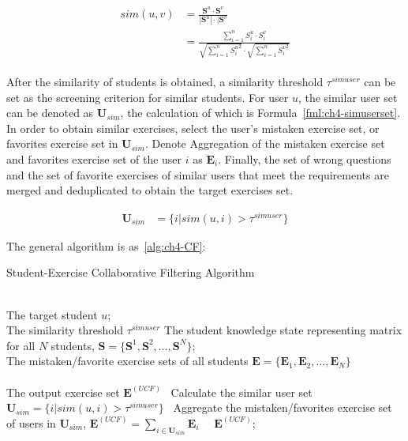 \begin{align}\label{fml:ch4-user_similarity}
  \begin{split}
    sim(u, v) & =\frac{\mathbf{S}^u \cdot \mathbf{S}^v}{|\mathbf{S}^u|\cdot |\mathbf{S}^v}                                                                 \\
    & =\frac{\sum\limits_{i = 1}^{n}{S^u_i\cdot S^v_i}}{\sqrt{\sum\limits_{i = 1}^{n}{{S^u_i}^2}}\cdot\sqrt{\sum\limits_{i = 1}^{n}{{S^v_i}^2}}}
  \end{split}
\end{align}

After the similarity of students is obtained, a similarity threshold \(\tau^{simuser}\) can be set as the screening criterion for similar students. For user \(u\), the similar user set can be denoted as \(\mathbf{U}_{sim}\), the calculation of which is Formula~\ref{fml:ch4-simuserset}. In order to obtain similar exercises, select the user's mistaken exercise set, or favorites exercise set in \(\mathbf{U}_{sim}\). Denote Aggregation of the mistaken exercise set and favorites exercise set of the user \(i\) as \(\mathbf{E}_{i}\). Finally, the set of wrong questions and the set of favorite exercises of similar users that meet the requirements are merged and deduplicated to obtain the target exercises set.

\begin{align}
  \mathbf{U}_{sim} & =\{i|sim(u,i)>\tau^{simuser}\}  \label{fml:ch4-simuserset}
\end{align}

The general algorithm is as~\ref{alg:ch4-CF}:
\begin{algorithm}[htbp!]
  \caption{Student-Exercise Collaborative Filtering Algorithm}\label{alg:ch4-CF}
  \begin{algorithmic}
    \REQUIRE~~\\
    The target student \(u\); \\
    The similarity threshold \(\tau^{simuser}\)
    The student knowledge state representing matrix for all \(N\) students, \(\mathbf{S}=\{\mathbf{S}^1,\mathbf{S}^2,\ldots,\mathbf{S}^N\} \);\\
    The mistaken/favorite exercise sets of all students \( \mathbf{E}=\{\mathbf{E}_1,\mathbf{E}_2,\ldots,\mathbf{E}_N\} \) \\
    \ENSURE~~\\ %
    The output exercise set \(\mathbf{E}^{(UCF)} \)
    \STATE~Calculate the similar user set \(\mathbf{U}_{sim}=\{i|sim(u,i)>\tau^{simuser}\}  \)
    \STATE~Aggregate the mistaken/favorites exercise set of users in \(\mathbf{U}_{sim}\), \(\mathbf{E}^{(UCF)}=\sum\limits_{i \in \mathbf{U}_{sim}}{\mathbf{E}_{i}}\)
    \RETURN~~\(\mathbf{E}^{(UCF)} \); %
  \end{algorithmic}
\end{algorithm}

